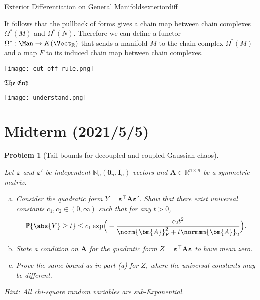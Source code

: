 \documentclass[11pt, a3paper, openany]{article}
\newcommand{\N}{\ensuremath{\mathbb{N}}}
\newcommand{\R}{\ensuremath{\mathbb{R}}}
\renewcommand{\P}{\mathbb{P}}
\theoremstyle{remark}
\theoremstyle{remark}
\theoremstyle{remark}
\newenvironment{Proof of claim}
  {\begin{proof}[\normalfont \textbf{Proof of claim}]}
  {\end{proof}}
\theoremstyle{definition}
\theoremstyle{remark}
\theoremstyle{plain}
\newtheorem{Prob}{Problem}
\begin{document}
\begin{Remark}{Exterior Differentiation on General Manifolds}{exteriordiff}
\begin{center}
\end{center}
It follows that the pullback of forms gives a chain map between chain complexes $\Omega^*(M)$ and $\Omega^*(N)$. Therefore we can define a functor $\Omega^*:\Man \to K(\Vect_\mathbb{R})$ that sends a manifold $M$ to the chain complex $\Omega^*(M)$ and a map $F$ to its induced chain map between chain complexes.
\end{Remark}
\vspace{2.333ex}
\begin{center}
	\texttt{[image: cut-off\_rule.png]}
	\vspace{-5ex}
\end{center}
\hfill {\Large $\mathfrak{The\ End}$ \Coffeecup}
\vspace{5.555ex}
\begin{center}
	\texttt{[image: understand.png]}
\end{center}


\clearpage
\appendix
{}

\section*{\bf Midterm \sf\scriptsize (2021/5/5)}
\begin{Prob}[Tail bounds for decoupled and coupled Gaussian chaos]\ 

Let $\bm{\varepsilon}$ and $\bm{\varepsilon}'$ be independent $\N_{n}(\bm{0}_{n},\bm{I}_{n})$ vectors and $\bm{A} \in \R^{n \times n}$ be a symmetric matrix. 
\begin{enumerate}[(a)]
	\setlength{\itemsep}{0pt}
\item Consider the quadratic form $Y = \bm{\varepsilon}^{\top}\bm{A}\bm{\varepsilon}'$. Show that there exist universal constants $c_{1},c_{2} \in (0,\infty)$ such that for any $t > 0$, \vspace{-2ex}
\[ \P\{ \abs{Y} \geq t \} \leq c_{1} \exp\!\Big( - \frac{c_{2}t^{2}}{\norm{\bm{A}}_{\mathrm{F}}^{2}+t\normmm{\bm{A}}_{2}} \Big) . \vspace{-1ex}\] 
\item State a condition on $\bm{A}$ for the quadratic form $Z = \bm{\varepsilon}^{\top}\bm{A}\bm{\varepsilon}$ to have mean zero. 
\item Prove the same bound as in part (a) for $Z$, where the universal constants may be different.
\end{enumerate}
\normalfont Hint: All chi-square random variables are sub-Exponential.
\end{Prob}
\end{document}
